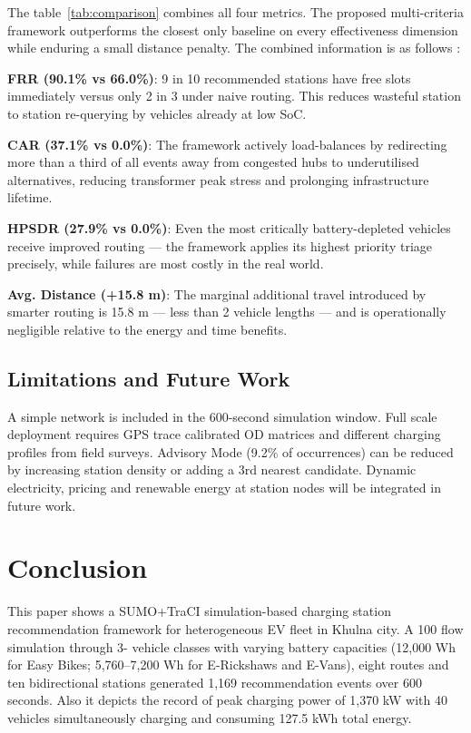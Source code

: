 \documentclass[conference]{IEEEtran}
\begin{document}
The table~\ref{tab:comparison} combines all four metrics. The proposed
multi-criteria framework outperforms the closest only baseline on every
effectiveness dimension while enduring a small distance
penalty. The combined information is as follows :

\textbf{FRR (90.1\% vs 66.0\%)}: 9 in 10 recommended stations have
free slots immediately versus only 2 in 3 under naive routing. This
reduces wasteful station to station re-querying by vehicles already at
low SoC.

\textbf{CAR (37.1\% vs 0.0\%)}: The framework actively load-balances
by redirecting more than a third of all events away from congested hubs
to underutilised alternatives, reducing transformer peak stress and
prolonging infrastructure lifetime.

\textbf{HPSDR (27.9\% vs 0.0\%)}: Even the most critically
battery-depleted vehicles receive improved routing --- the framework
applies its highest priority triage precisely, while failures are most
costly in the real world.

\textbf{Avg. Distance (+15.8 m)}: The marginal additional travel introduced
by smarter routing is 15.8 m --- less than 2 vehicle lengths --- and is
operationally negligible relative to the energy and time benefits.

\subsection{Limitations and Future Work}

A simple network is included in the 600-second simulation window. Full
scale deployment requires GPS trace calibrated OD matrices and different
charging profiles from field surveys. Advisory Mode (9.2\% of
occurrences) can be reduced by increasing station density or adding a
3rd nearest candidate. Dynamic electricity, 
pricing and renewable energy at station nodes will be integrated in future work.


\vspace{-3mm}
\section{Conclusion}

This paper shows a SUMO+TraCI simulation-based charging station
recommendation framework for heterogeneous EV fleet in Khulna city. A
100 flow simulation through 3- vehicle classes with varying battery
capacities (12,000 Wh for Easy Bikes; 5,760--7,200 Wh for E-Rickshaws
and E-Vans), eight routes and ten bidirectional stations generated 1,169
recommendation events over 600 seconds. Also it depicts the record of peak
charging power of 1,370 kW with 40 vehicles simultaneously charging and
consuming 127.5 kWh total energy.
\end{document}
